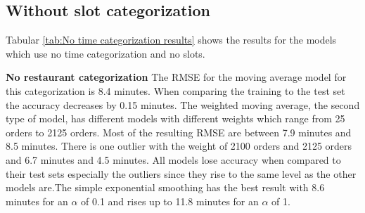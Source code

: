 \subsection{Without slot categorization}
Tabular \ref{tab:No time categorization results} shows the results for the models which use no time categorization and no slots.
\begin{table}[h]
\centering
\caption{No time categorization and without slots}
\label{tab:No time categorization results}
\end{table}
\newline\newline\textbf{No restaurant categorization}\newline
The RMSE for the moving average model for this categorization is 8.4 minutes. When comparing the training to the test set the accuracy decreases by 0.15 minutes. The weighted moving average, the second type of model, has different models with different weights which range from 25 orders to 2125 orders. Most of the resulting RMSE are between 7.9 minutes and 8.5 minutes. There is one outlier with the weight of 2100 orders and 2125 orders and 6.7 minutes and 4.5 minutes. All models lose accuracy when compared to their test sets especially the outliers since they rise to the same level as the other models are.\newline The simple exponential smoothing has the best result with 8.6 minutes for an $\alpha$ of 0.1 and rises up to 11.8 minutes for an $\alpha$ of 1.
